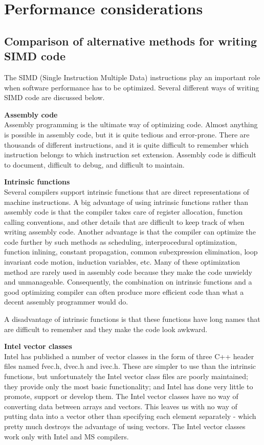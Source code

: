 \documentclass[vcl_manual.tex]{subfiles}
\begin{document}
\chapter{Performance considerations}\label{chap:PerformanceConsiderations}

\section{Comparison of alternative methods for writing SIMD code}\label{AlternativeMethodsForSIMDCode}
\flushleft

The SIMD (Single Instruction Multiple Data) instructions play an important role when software performance has to be optimized. Several different ways of writing SIMD code are discussed below.

\textbf{Assembly code}\\
Assembly programming is the ultimate way of optimizing code. Almost anything is possible in assembly code, but it is quite tedious and error-prone. There are thousands of different instructions, and it is quite difficult to remember which instruction belongs to which instruction set extension. Assembly code is difficult to document, difficult to debug, and difficult to maintain.

\textbf{Intrinsic functions}\\
Several compilers support intrinsic functions that are direct representations of machine instructions. A big advantage of using intrinsic functions rather than assembly code is that the compiler takes care of register allocation, function calling conventions, and other details that are difficult to keep track of when writing assembly code. Another advantage is that the compiler can optimize the code further by such methods as scheduling, interprocedural optimization, function inlining, constant propagation, common subexpression elimination, loop invariant code motion, induction variables, etc. Many of these optimization method are rarely used in assembly code because they make the code unwieldy and unmanageable. Consequently, the combination on intrinsic functions and a good optimizing compiler can often produce more efficient code than what a decent assembly programmer would do.

A disadvantage of intrinsic functions is that these functions have long names that are difficult to remember and they make the code look awkward.

\textbf{Intel vector classes}\\
Intel has published a number of vector classes in the form of three C++ header files named fvec.h, dvec.h and ivec.h. These are simpler to use than the intrinsic functions, but unfortunately the Intel vector class files are poorly maintained; they provide only the most basic functionality; and Intel has done very little to promote, support or develop them. The Intel vector classes have no way of converting data between arrays and vectors. This leaves us with no way of putting data into a vector other than specifying each element separately - which pretty much destroys the advantage of using vectors. The Intel vector classes work only with Intel and MS compilers.
\end{document}
